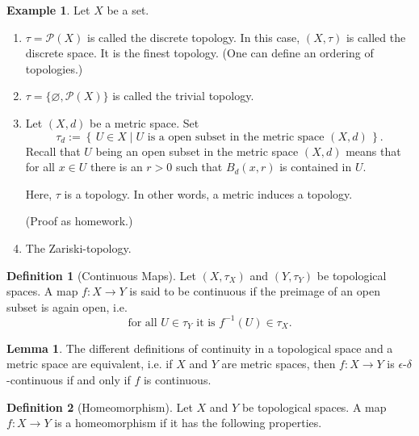 \documentclass[a4paper]{book}
\theoremstyle{definition}
\newtheorem{definition}{Definition}[chapter]
\newtheorem{example}{Example}[definition]
\newtheorem{lemma}{Lemma}[definition]
\newcommand{\makeset}[2]{\left\{\, #1 \mid #2 \,\right\}}
\begin{document}
\begin{example}
    Let \(X\) be a set.
    \begin{enumerate}
        \item \(\tau = \mathcal{P}(X)\) is called the {\color{maththen}discrete topology}. In this case, \((X, \tau)\) is called the {\color{maththen}discrete space}. It is the finest topology. (One can define an ordering of topologies.)
        \item \(\tau = \{\varnothing, \mathcal{P}(X)\}\) is called the {\color{maththen}trivial topology}.
        \item Let \((X, d)\) be a {\color{mathif}metric space}. Set
        \begin{equation}
            \tau_d := \makeset{U \in X}{U \text{ is a open subset in the metric space } (X, d)} \text{.}
        \end{equation}
        Recall that \(U\) being an open subset in the metric space \((X, d)\) means that for all \(x \in U\) there is an \(r > 0\) such that \(B_d(x, r)\) is contained in \(U\).

        Here, \(\tau\) is a topology. In other words, a metric induces a topology.

        (Proof as homework.)
        \item The Zariski-topology.
    \end{enumerate}

    \begin{definition}[Continuous Maps]
        Let \((X, \tau_X)\) and \((Y, \tau_Y)\) be {\color{mathif}topological spaces}. A {\color{mathif}map} \(f: X \longrightarrow Y\) is said to be {\color{maththen}continuous} if the preimage of an open subset is again open, i.e.
        \begin{equation}
            \text{for all } U \in \tau_Y \text{ it is } f^{-1}(U) \in \tau_X \text{.}
        \end{equation}
    \end{definition}

    \begin{lemma}
        The different definitions of continuity in a topological space and a metric space are equivalent, i.e. if \(X\) and \(Y\) are metric spaces, then \(f: X \longrightarrow Y\) is \(\epsilon\)-\(\delta\)-continuous if and only if \(f\) is continuous.
    \end{lemma}

    \begin{definition}[Homeomorphism]
        Let \(X\) and \(Y\) be topological spaces. A map \(f: X \longrightarrow Y\) is a homeomorphism if it has the following properties.


\end{definition}
\end{example}
\end{document}

